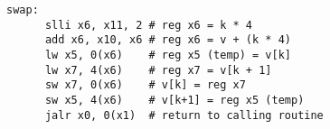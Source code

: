 \documentclass[varwidth]{standalone}
\begin{document}
  \begin{BVerbatim}[gobble=4]
    swap:
      slli x6, x11, 2 # reg x6 = k * 4
      add x6, x10, x6 # reg x6 = v + (k * 4)
      lw x5, 0(x6)    # reg x5 (temp) = v[k]
      lw x7, 4(x6)    # reg x7 = v[k + 1]
      sw x7, 0(x6)    # v[k] = reg x7
      sw x5, 4(x6)    # v[k+1] = reg x5 (temp)
      jalr x0, 0(x1)  # return to calling routine
  \end{BVerbatim}
\end{document}

